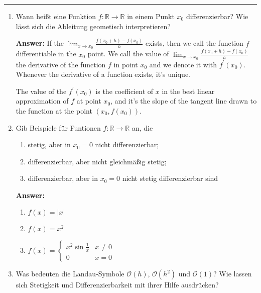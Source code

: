 \documentclass[11pt]{article}
\newcommand{\abs}[1]{\left|#1\right|}
\newcommand{\RR}[0]{\mathbb{R}}
\newcommand{\smallo}[0]{{\scriptstyle \mathcal{O}}}
\begin{document}


\medskip\hrule
\begin{enumerate}
    \item Wann heißt eine Funktion $f\colon \RR\to\RR$ in einem Punkt $x_0$ differenzierbar? Wie lässt sich die Ableitung geometisch interpretieren?
    
    \textbf{Answer:}
    If the $\lim_{x\to x_0}\frac{f(x_0 + h) - f(x_0)}{h}$ exists, then we call the function $f$ differentiable in the $x_0$ point. We call the value of $\lim_{x\to x_0}\frac{f(x_0 + h) - f(x_0)}{h}$ the derivative of the function $f$ in point $x_0$ and we denote it with $f^\prime(x_0)$. Whenever the derivative of a function exists, it's unique.

    The value of the $f^\prime(x_0)$ is the coefficient of $x$ in the best linear approximation of $f$ at point $x_0$, and it's the slope of the tangent line drawn to the function at the point $(x_0, f(x_0))$.

    \item  Gib Beispiele für Funtionen $f\colon \RR\to\RR$ an, die
    \begin{enumerate}
        \item stetig, aber in $x_0 = 0$ nicht differenzierbar;
        \item differenzierbar, aber nicht gleichmäßig stetig;
        \item differenzierbar, aber in $x_0 = 0$ nicht stetig differenzierbar sind
    \end{enumerate}

    \textbf{Answer:}

    \begin{enumerate}
        \item $f(x) = \abs{x}$
        \item $f(x) = x^2$
        \item $f(x) = \begin{cases}
            x^2 \sin{\frac{1}{x}}&x\neq0\\
            0&x=0
        \end{cases}$
    \end{enumerate}

    \item Was bedeuten die Landau-Symbole $\smallo(h)$, $\mathcal{O}(h^2)$ und ${ \scriptstyle \mathcal{O}}(1)$? Wie lassen sich Stetigkeit und Differenzierbarkeit mit ihrer Hilfe ausdrücken?
    

\end{enumerate}
\end{document}
